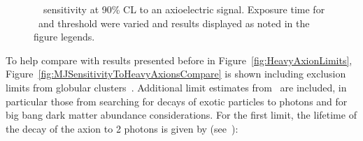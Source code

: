 			\begin{figure}
				\centering
				\def\figheight{0.38\textheight}
				\caption[\MJ~\minmod~sensitivity at 90\% CL to an axioelectric signal]{
				\MJ~\minmod~sensitivity at 90\% CL to an axioelectric signal.  Exposure time for \hthree~and threshold were varied and results displayed as noted
				in the figure legends.}
				\label{fig:MJSensitivityToAxion}
			\end{figure}	
				
	To help compare with results presented before in Figure~\ref{fig:HeavyAxionLimits}, Figure~\ref{fig:MJSensitivityToHeavyAxionsCompare} is shown including exclusion limits from %
	globular clusters~\cite{Raffelt95}.  Additional limit estimates from~\cite{Pospelov:2008jk} are included, in particular those from searching for decays of exotic particles to photons and for big bang dark matter abundance considerations.  For the first limit, the lifetime of the decay of the axion to 2 photons is given by (see~\cite{Pospelov:2008jk}):
	
